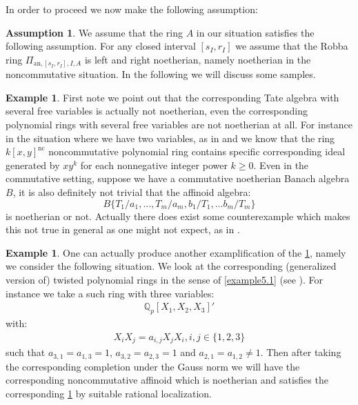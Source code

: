 \documentclass[12pt]{amsart}
\theoremstyle{definition}
\numberwithin{equation}{section}
\newtheorem{example}[theorem]{Example}
\newtheorem{assumption}[theorem]{Assumption}
\begin{document}
\indent In order to proceed we now make the following assumption:

\begin{assumption} \label{assumption6.12}
We assume that the ring $A$ in our situation satisfies the following assumption. For any closed interval $[s_I,r_I]$ we assume that the Robba ring $\Pi_{\mathrm{an},[s_I,r_I],I,A}$ is left and right noetherian, namely noetherian in the noncommutative situation. In the following we will discuss some samples.
\end{assumption}


\begin{example} 
First note we point out that the corresponding Tate algebra with several free variables is actually not noetherian, even the corresponding polynomial rings with several free variables are not noetherian at all. For instance in the situation where we have two variables, as in \cite[Introduction]{K1} and \cite[Exercise 1E]{GW1} we know that the ring $k[x,y]^\mathrm{nc}$ noncommutative polynomial ring contains specific corresponding ideal generated by $xy^k$ for each nonnegative integer power $k\geq 0$. Even in the commutative setting, suppose we have a commutative noetherian Banach algebra $B$, it is also definitely not trivial that the affinoid algebra:
\begin{displaymath}
B\{T_1/a_1,...,T_m/a_m,b_1/T_1,...b_m/T_m\}	
\end{displaymath}
is noetherian or not. Actually there does exist some counterexample which makes this not true in general as one might not expect, as in \cite[8.3]{FGK}. 
\end{example}



\begin{example}
One can actually produce another examplification of the \cref{assumption6.12}, namely we consider the following situation. We look at the corresponding (generalized version of) twisted polynomial rings in the sense of \cref{example5.1} (see \cite[Section 3]{So1}). For instance we take a such ring with three variables:
\begin{align}
\mathbb{Q}_p[X_1,X_2,X_3]'	
\end{align}
with:
\begin{align}
X_iX_j=a_{i,j}X_jX_i,i,j\in\{1,2,3\}	
\end{align}
such that $a_{3,1}=a_{1,3}=1$, $a_{3,2}=a_{2,3}=1$ and $a_{2,1}=a_{1,2}\neq 1$. Then after taking the corresponding completion under the Gauss norm we will have the corresponding noncommutative affinoid which is noetherian and satisfies the corresponding \cref{assumption6.12} by suitable rational localization.
\end{example}
\end{document}
